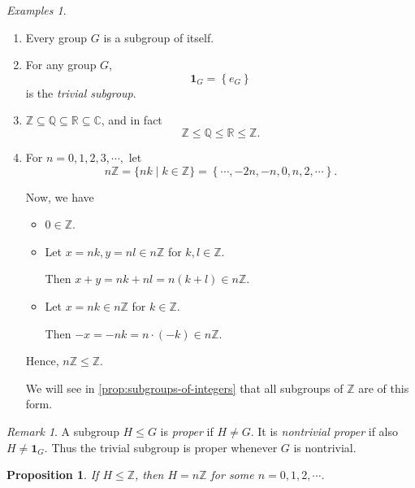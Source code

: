 \documentclass{article}
\newtheorem{proposition}[theorem]{Proposition}
\theoremstyle{definition}
\theoremstyle{remark}
\newtheorem{remark}[theorem]{Remark}
\newcommand{\pqty}[1]{\left(#1\right)}
\newcommand{\Bqty}[1]{\left\{#1\right\}}
\newcommand{\set}[2]{\{#1\mid #2\}}
\newcommand{\subgroup}{\leq}
\newcommand{\ZZ}{\mathbb{Z}}
\newcommand{\QQ}{\mathbb{Q}}
\newcommand{\RR}{\mathbb{R}}
\newcommand{\CC}{\mathbb{C}}
\newtheorem*{examples*}{Examples}
\newcommand{\trivialgp}{\mathbf{1}}
\begin{document}
\begin{examples*}
    \begin{enumerate}
        \item Every group \(G\) is a subgroup of itself.

        \item For any group \(G\),
        \[
            \trivialgp_G = \Bqty{e_G}
        \]
        is the \emph{trivial subgroup}.

        \item \(\ZZ \subseteq \QQ \subseteq \RR \subseteq \CC\), and in fact
        \[
            \ZZ \subgroup \QQ \subgroup \RR \subgroup \ZZ.
        \]

        \item For \(n = 0, 1, 2, 3, \cdots,\) let
        \[
            n\ZZ = \set{nk}{k \in \ZZ} = \Bqty{\cdots, -2n, -n, 0, n, 2, \cdots}.
        \]

        Now, we have
        \begin{itemize}
            \item \(0 \in \ZZ\).
            \item Let \(x = nk, y = nl \in n\ZZ\) for \(k, l \in \ZZ\).
            
            Then \(x + y = nk + nl = n \pqty{k + l} \in n\ZZ\).
            \item Let \(x = nk \in n\ZZ\) for \(k \in \ZZ\).
            
            Then \(-x = -nk = n \cdot \pqty{-k} \in n\ZZ\).
        \end{itemize}

        Hence, \(n\ZZ \subgroup \ZZ\).

        We will see in \autoref{prop:subgroups-of-integers} that all subgroups of \(\ZZ\) are of this form.
    \end{enumerate}
\end{examples*}

\begin{remark}
    A subgroup \(H\leq G\) is \emph{proper} if \(H\neq G\). It is \emph{nontrivial proper} if also \(H\neq\trivialgp_G\). Thus the trivial subgroup is proper whenever \(G\) is nontrivial.
\end{remark}

\begin{proposition}
    \label{prop:subgroups-of-integers}%
    If \(H \subgroup \ZZ\), then \(H = n\ZZ\) for some \(n = 0, 1, 2, \cdots\).
\end{proposition}
\end{document}
